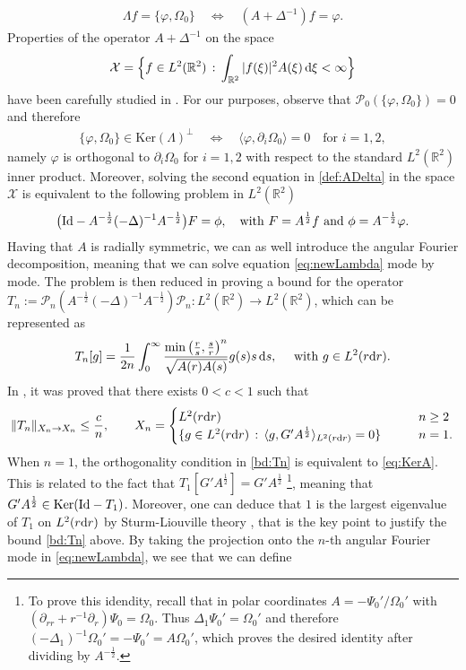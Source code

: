\documentclass[11pt,reqno,a4paper]{amsart}
\def\dd{{\rm d}}
\def\de{{\partial}}
\def\RR {\mathbb{R}}
\newcommand{\cP}{\mathcal{P}}
\newcommand{\cX}{\mathcal{X}}
\newcommand{\1}{\mathbbm{1}}
\theoremstyle{definition}
\theoremstyle{definition}
\numberwithin{equation}{section}
\begin{document}
\begin{align}
\label{def:ADelta}
  \Lambda f=\{\varphi,\Omega_0\}\quad \iff \quad  (A+\Delta^{-1})f=\varphi.
\end{align}
Properties of the operator $A+\Delta^{-1}$ on the space 
\begin{align}
\label{def:XLambda}
    \cX=\Big\{ f\in L^2(\RR^2) \, :\, \int_{\RR^2}|f(\xi)|^2A(\xi)\, \dd \xi<\infty\Big\}
\end{align}
have been carefully studied in \cite[Section 2]{GaSarnold}. For our purposes, observe that $\cP_0(\{\varphi,\Omega_0\})=0$ and therefore 
\begin{align}
\label{eq:KerA}
    \{\varphi,\Omega_0\}\in \mathrm{Ker}(\Lambda)^\perp \quad \iff \quad \langle \varphi,\de_i \Omega_0\rangle=0 \quad \text{for }i=1,2,
\end{align}
namely $\varphi$ is orthogonal to $\de_i \Omega_0$ for $i=1,2$ with respect to the standard $L^2(\RR^2)$ inner product. Moreover, solving  the second equation in \cref{def:ADelta} in the space $\cX$ is  equivalent to the following problem in $L^2(\RR^2)$
\begin{align}
\label{eq:newLambda}
    \big({\rm Id}-A^{-\frac12}(-\Delta)^{-1}A^{-\frac12}\big)F=\phi, \quad \text{with } F=A^{\frac12}f \text{ and } \phi=A^{-\frac12}\varphi.
\end{align}
Having that $A$ is radially symmetric, we can as well introduce the angular Fourier decomposition, meaning that we can solve equation \cref{eq:newLambda} mode by mode. The problem is then reduced in proving a bound for the operator $T_n:=\cP_n(A^{-\frac12}(-\Delta)^{-1}A^{-\frac12})\cP_n : L^2(\RR^2)\to L^2(\RR^2)$, which can be represented as 
\begin{align}
\label{def:Tn}
 T_n[g]=\frac{1}{2n}\int_{0}^\infty \frac{\min\big(\frac{r}{s},\frac{s}{r}\big)^n}{\sqrt{A(r)A(s)}}g(s) s \, \dd s,    \quad \text{ with } g\in L^2(r\dd r).
\end{align}
In \cite{GaSarnold}, it was proved that there exists $0<c<1$ such that 
\begin{equation}
\label{bd:Tn}
    \|T_n\|_{X_n\to X_n}\leq \frac{c}{n}, \qquad X_n=\begin{cases}
        L^2(r\dd r) \qquad &n\geq 2\\
       \{g\in L^2(r\dd r)\, : \, \langle g, G' A^\frac12\rangle_{L^2(r\dd r)}=0\}\qquad &n=1.
    \end{cases}
\end{equation}
When $n=1$, the orthogonality condition in \cref{bd:Tn} is equivalent to \cref{eq:KerA}. This is  related to the fact that $T_1[G'A^{\frac12}]=G'A^{\frac12}$ \footnote{To prove this idendity, recall that in polar coordinates $A=-\Psi_0'/\Omega_0'$ with $(\de_{rr}+r^{-1}\de_r)\Psi_0=\Omega_0$. Thus $\Delta_1\Psi_0'=\Omega_0'$ and therefore $(-\Delta_1)^{-1}\Omega_0'=-\Psi_0'=A \Omega_0'$, which proves the desired identity after dividing by $A^{-\frac12}$.}, meaning that $G'A^\frac12\in \mathrm{Ker}({\rm Id}-T_1)$. Moreover,  one can deduce that $1$ is the largest eigenvalue of $T_1$ on $L^2(r\dd r)$ by Sturm-Liouville theory \cite{GaSarnold}, that is the key point to justify the bound \cref{bd:Tn} above. By taking the projection onto the $n$-th angular Fourier mode in \cref{eq:newLambda}, we see that we can define
\end{document}

